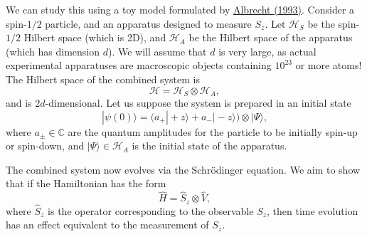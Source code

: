 \documentclass[pra,12pt]{revtex4}
\begin{document}
We can study this using a toy model formulated by
\hyperref[cite:albrecht]{Albrecht (1993)}.  Consider a spin-$1/2$
particle, and an apparatus designed to measure $S_z$.  Let
$\mathscr{H}_S$ be the spin-$1/2$ Hilbert space (which is 2D), and
$\mathscr{H}_A$ be the Hilbert space of the apparatus (which has
dimension $d$).  We will assume that $d$ is very large, as actual
experimental apparatuses are macroscopic objects containing $10^{23}$
or more atoms!  The Hilbert space of the combined system is
\begin{equation}
  \mathscr{H} = \mathscr{H}_S \otimes \mathscr{H}_A,
\end{equation}
and is $2d$-dimensional.  Let us suppose the system is prepared in an initial
state
\begin{equation}
  |\psi(0)\rangle = \Big(a_+ |\!+z\rangle + a_- |\!-z\rangle\Big) \otimes |\Psi\rangle,
\end{equation}
where $a_\pm\in\mathbb{C}$ are the quantum amplitudes for the particle
to be initially spin-up or spin-down, and $|\Psi\rangle \in
\mathscr{H}_A$ is the initial state of the apparatus.

The combined system now evolves via the Schr\"odinger equation.  We
aim to show that if the Hamiltonian has the form
\begin{equation}
  \hat{H} = \hat{S}_z \otimes \hat{V},
\end{equation}
where $\hat{S}_z$ is the operator corresponding to the observable
$S_z$, then time evolution has an effect equivalent to the measurement
of $S_z$.
\end{document}
